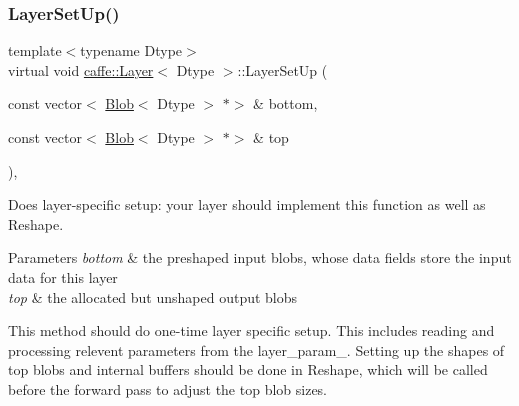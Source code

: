 \subsubsection{\texorpdfstring{Layer\+Set\+Up()}{LayerSetUp()}\hspace{0.1cm}{\footnotesize\ttfamily [1/2]}}
{\footnotesize\ttfamily template$<$typename Dtype$>$ \\
virtual void \mbox{\hyperlink{classcaffe_1_1_layer}{caffe\+::\+Layer}}$<$ Dtype $>$\+::Layer\+Set\+Up (\begin{DoxyParamCaption}\item[{const vector$<$ \mbox{\hyperlink{classcaffe_1_1_blob}{Blob}}$<$ Dtype $>$ $\ast$$>$ \&}]{bottom,  }\item[{const vector$<$ \mbox{\hyperlink{classcaffe_1_1_blob}{Blob}}$<$ Dtype $>$ $\ast$$>$ \&}]{top }\end{DoxyParamCaption})\hspace{0.3cm}{\ttfamily [inline]}, {\ttfamily [virtual]}}



Does layer-\/specific setup\+: your layer should implement this function as well as Reshape. 


\begin{DoxyParams}{Parameters}
{\em bottom} & the preshaped input blobs, whose data fields store the input data for this layer \\
\hline
{\em top} & the allocated but unshaped output blobs\\
\hline
\end{DoxyParams}
This method should do one-\/time layer specific setup. This includes reading and processing relevent parameters from the {\ttfamily layer\+\_\+param\+\_\+}. Setting up the shapes of top blobs and internal buffers should be done in {\ttfamily Reshape}, which will be called before the forward pass to adjust the top blob sizes. 

